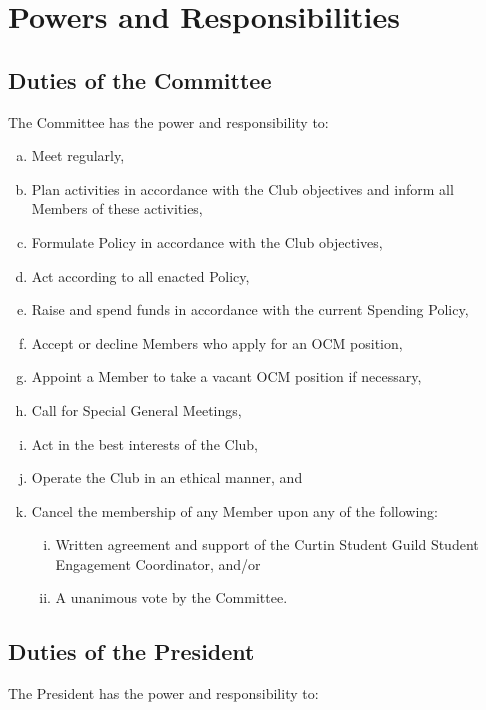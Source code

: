 \documentclass[a4paper,12pt]{article}
\begin{document}
\section{Powers and Responsibilities}

\subsection{Duties of the Committee}

The Committee has the power and responsibility to:

\begin{enumerate}[a)]
	\item Meet regularly,
	\item Plan activities in accordance with the Club objectives and inform all Members of these activities,
	\item Formulate Policy in accordance with the Club objectives,
	\item Act according to all enacted Policy,
	\item Raise and spend funds in accordance with the current Spending Policy,
	\item Accept or decline Members who apply for an OCM position,
	\item Appoint a Member to take a vacant OCM position if necessary,
	\item Call for Special General Meetings,
	\item Act in the best interests of the Club,
	\item Operate the Club in an ethical manner, and
	\item Cancel the membership of any Member upon any of the following:
	\begin{enumerate}[i)]
		\item Written agreement and support of the Curtin Student Guild Student Engagement Coordinator, and/or
		\item A unanimous vote by the Committee.
	\end{enumerate}
\end{enumerate}

\subsection{Duties of the President}

The President has the power and responsibility to:
\end{document}
